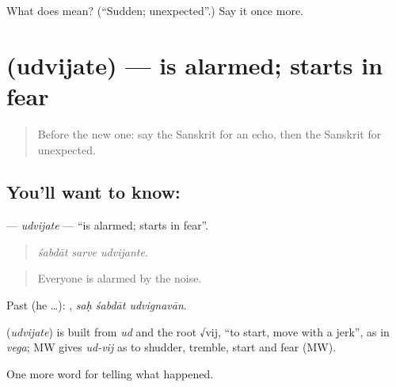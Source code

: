 \begin{tcolorbox}[breakable,colback=teal!4,colframe=teal!35!black,title={Before you move on}]
What does  mean? (\textquotedblleft{}Sudden; unexpected\textquotedblright{}.) Say it once more.
\end{tcolorbox}
\section[\texorpdfstring{\sk{उद्विजते} (udvijate)}{उद्विजते (udvijate)}]{ (udvijate) — is alarmed; starts in fear}

\label{lesson:SA-C315-udvijate}



\begin{quote}
Before the new one: say the Sanskrit for an echo, then the Sanskrit for unexpected.
\end{quote}

\subsection*{You'll want to know: }
\textbf{} — \emph{udvijate} — \textquotedblleft{}is alarmed; starts in fear\textquotedblright{}.

\begin{quote}
  
\end{quote}

\begin{quote}
\emph{śabdāt sarve udvijante.}
\end{quote}

\begin{quote}
Everyone is alarmed by the noise.
\end{quote}

Past (he …):   , \emph{saḥ śabdāt udvignavān}.

\begin{cousinweb}
\textbf{} (\emph{udvijate}) is built from \emph{ud} and the root √vij, \textquotedblleft{}to start, move with a jerk\textquotedblright{}, as in \emph{vega}; MW gives \emph{ud-vij} as to shudder, tremble, start and fear (MW).
\end{cousinweb}

\begin{grammarlens}[title={What you've built}]
One more word for telling what happened.
\end{grammarlens}


